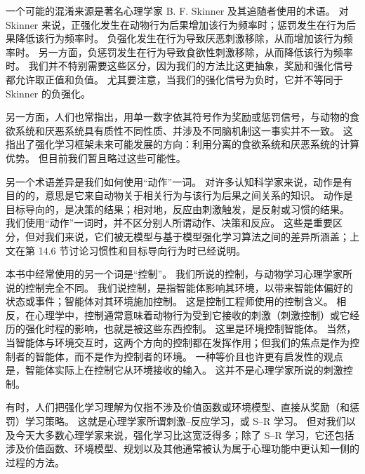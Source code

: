 \documentclass[UTF8, 12pt, fontset=fandol, oneside]{ctexart}
\begin{document}
一个可能的混淆来源是著名心理学家 B. F. Skinner 及其追随者使用的术语。
对 Skinner 来说，正强化发生在动物行为后果增加该行为频率时；惩罚发生在行为后果降低该行为频率时。
负强化发生在行为导致厌恶刺激移除，从而增加该行为频率时。
另一方面，负惩罚发生在行为导致食欲性刺激移除，从而降低该行为频率时。
我们并不特别需要这些区分，因为我们的方法比这更抽象，奖励和强化信号都允许取正值和负值。
尤其要注意，当我们的强化信号为负时，它并不等同于 Skinner 的负强化。

另一方面，人们也常指出，用单一数字依其符号作为奖励或惩罚信号，与动物的食欲系统和厌恶系统具有质性不同性质、并涉及不同脑机制这一事实并不一致。
这指出了强化学习框架未来可能发展的方向：利用分离的食欲系统和厌恶系统的计算优势。
但目前我们暂且略过这些可能性。

另一个术语差异是我们如何使用“动作”一词。
对许多认知科学家来说，动作是有目的的，意思是它来自动物关于相关行为与该行为后果之间关系的知识。
动作是目标导向的，是决策的结果；相对地，反应由刺激触发，是反射或习惯的结果。
我们使用“动作”一词时，并不区分别人所谓动作、决策和反应。
这些是重要区分，但对我们来说，它们被无模型与基于模型强化学习算法之间的差异所涵盖；上文在第 14.6 节讨论习惯性和目标导向行为时已经说明。

本书中经常使用的另一个词是“控制”。
我们所说的控制，与动物学习心理学家所说的控制完全不同。
我们说控制，是指智能体影响其环境，以带来智能体偏好的状态或事件；智能体对其环境施加控制。
这是控制工程师使用的控制含义。
相反，在心理学中，控制通常意味着动物行为受到它接收的刺激（刺激控制）或它经历的强化时程的影响，也就是被这些东西控制。
这里是环境控制智能体。
当然，当智能体与环境交互时，这两个方向的控制都在发挥作用；但我们的焦点是作为控制者的智能体，而不是作为控制者的环境。
一种等价且也许更有启发性的观点是，智能体实际上在控制它从环境接收的输入。
这并不是心理学家所说的刺激控制。

有时，人们把强化学习理解为仅指不涉及价值函数或环境模型、直接从奖励（和惩罚）学习策略。
这就是心理学家所谓刺激--反应学习，或 S--R 学习。
但对我们以及今天大多数心理学家来说，强化学习比这宽泛得多；除了 S--R 学习，它还包括涉及价值函数、环境模型、规划以及其他通常被认为属于心理功能中更认知一侧的过程的方法。
\end{document}
